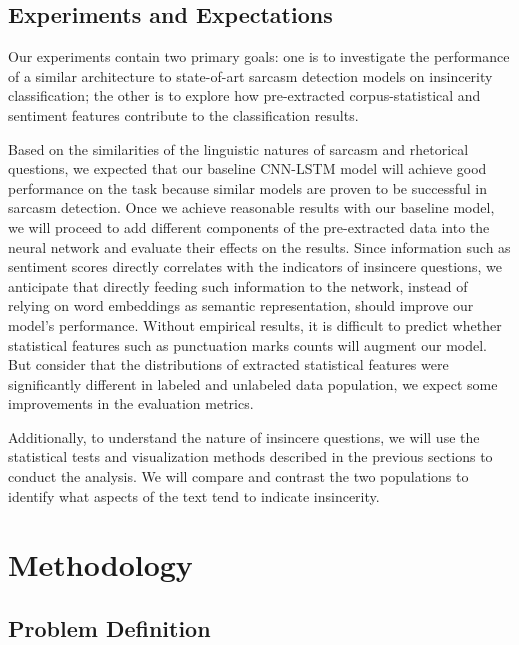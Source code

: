 \documentclass[12pt]{diazessay} %
\begin{document}
\subsection{Experiments and Expectations}

Our experiments contain two primary goals: one is to investigate the performance of a similar architecture to state-of-art sarcasm detection models on insincerity classification; the other is to explore how pre-extracted corpus-statistical and sentiment features contribute to the classification results. 

Based on the similarities of the linguistic natures of sarcasm and rhetorical questions, we expected that our baseline CNN-LSTM model will achieve good performance on the task because similar models are proven to be successful in sarcasm detection. Once we achieve reasonable results with our baseline model, we will proceed to add different components of the pre-extracted data into the neural network and evaluate their effects on the results. Since information such as sentiment scores directly correlates with the indicators of insincere questions, we anticipate that directly feeding such information to the network, instead of relying on word embeddings as semantic representation, should improve our model's performance. Without empirical results, it is difficult to predict whether statistical features such as punctuation marks counts will augment our model. But consider that the distributions of extracted statistical features were significantly different in labeled and unlabeled data population, we expect some improvements in the evaluation metrics.

Additionally, to understand the nature of insincere questions, we will use the statistical tests and visualization methods described in the previous sections to conduct the analysis. We will compare and contrast the two populations to identify what aspects of the text tend to indicate insincerity. 


\section{Methodology}
\subsection{Problem Definition}
\end{document}
